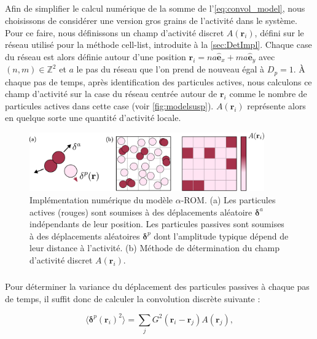 \subparagraph{}Afin de simplifier le calcul numérique de la somme de l'\autoref{eq:convol_model}, nous choisissons de considérer une version gros grains de l'activité dans le système. Pour ce faire, nous définissons un champ d'activité discret $A(\mathbf{r}_i)$, défini sur le réseau utilisé pour la méthode cell-list, introduite à la \autoref{sec:DetImpl}. Chaque case du réseau est alors définie autour d'une position $\mathbf{r}_i = na\hat{\mathbf{e}}_x + ma \hat{\mathbf{e}}_y$ avec $(n,m) \in \mathbb{Z}^2$ et $a$ le pas du réseau que l'on prend de nouveau égal à $D_p=1$. \`A chaque pas de temps, après identification des particules actives, nous calculons ce champ d'activité sur la case du réseau centrée autour de $\mathbf{r}_i$ comme le nombre de particules actives dans cette case (voir \autoref{fig:modelsusp}). $A(\mathbf{r}_i)$ représente alors en quelque sorte une quantité d'activité locale.

\begin{figure}[h]
	\centering
	\includegraphics[width=0.9\textwidth]{Chapitre3/Figures/Method/Model.pdf}
	\caption{Implémentation numérique du modèle $\alpha$-ROM. (a) Les particules actives (rouges) sont soumises à des déplacements aléatoire $\boldsymbol\delta^a$ indépendants de leur position. Les particules passives sont soumises à des déplacements aléatoires $\boldsymbol\delta^p$ dont l'amplitude typique dépend de leur distance à l'activité. (b) Méthode de détermination du champ d'activité discret $A(\mathbf{r}_i)$.}
	\label{fig:modelsusp}
\end{figure}

\subparagraph{}Pour déterminer la variance du déplacement des particules passives à chaque pas de temps, il suffit donc de calculer la convolution discrète suivante :

\begin{equation}
	\langle \boldsymbol\delta^p(\mathbf{r}_i)^2\rangle = \sum_{j} G^2(\mathbf{r}_i-\mathbf{r}_j) A(\mathbf{r}_j),
	\label{eq:kick_discret}
\end{equation}


